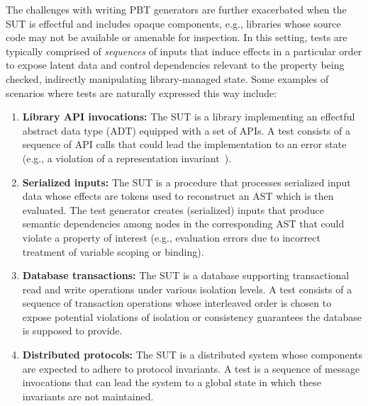 The challenges with writing PBT generators are further exacerbated
when the SUT is effectful and includes opaque components, e.g.,
libraries whose source code may not be available or amenable for
inspection. In this setting, tests are typically comprised of
\emph{sequences} of inputs that induce effects in a particular order
to expose latent data and control dependencies relevant to the
property being checked, indirectly manipulating library-managed state.
Some examples of scenarios where tests are naturally expressed this
way include:
\begin{enumerate}

\item \textbf{Library API invocations:} The SUT is a library
  implementing an effectful abstract data type (ADT) equipped with a
  set of APIs.  A test consists of a sequence of API calls that could
  lead the implementation to an error state (e.g., a violation of a
  representation invariant~\cite{MP+20,ZYDJ24}).

\item \textbf{Serialized inputs:} The SUT is a procedure that
  processes serialized input data whose effects are tokens used to
  reconstruct an AST which is then evaluated. The test generator
  creates (serialized) inputs that produce semantic dependencies among
  nodes in the corresponding AST that could violate a property of
  interest (e.g., evaluation errors due to incorrect treatment of
  variable scoping or binding).

\item \textbf{Database transactions:} The SUT is a database supporting
  transactional read and write operations under various isolation
  levels.  A test consists of a sequence of transaction operations
  whose interleaved order is chosen to expose potential violations of
  isolation or consistency guarantees the database is supposed to
  provide.

\item \textbf{Distributed protocols:} The SUT is a distributed system
  whose components are expected to adhere to protocol invariants.  A
  test is a sequence of message invocations that can lead the system
  to a global state in which these invariants are not maintained.
\end{enumerate}

